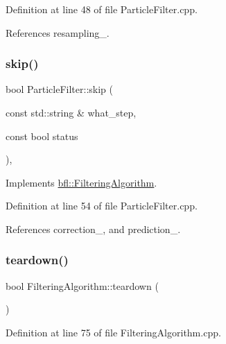 Definition at line 48 of file Particle\+Filter.\+cpp.



References resampling\+\_\+.

\mbox{\label{classbfl_1_1ParticleFilter_a2d7a5e7aaad179037273d35be229056d}} 
\subsubsection{\texorpdfstring{skip()}{skip()}}
{\footnotesize\ttfamily bool Particle\+Filter\+::skip (\begin{DoxyParamCaption}\item[{const std\+::string \&}]{what\+\_\+step,  }\item[{const bool}]{status }\end{DoxyParamCaption})\hspace{0.3cm}{\ttfamily [override]}, {\ttfamily [virtual]}}



Implements \mbox{\hyperlink{classbfl_1_1FilteringAlgorithm_ac8a718a614905d89d6a43bbbc70d68b2}{bfl\+::\+Filtering\+Algorithm}}.



Definition at line 54 of file Particle\+Filter.\+cpp.



References correction\+\_\+, and prediction\+\_\+.

\mbox{\label{classbfl_1_1FilteringAlgorithm_a1dc912d89ee8f96d4f3e8209865c5308}} 
\subsubsection{\texorpdfstring{teardown()}{teardown()}}
{\footnotesize\ttfamily bool Filtering\+Algorithm\+::teardown (\begin{DoxyParamCaption}{ }\end{DoxyParamCaption})\hspace{0.3cm}{\ttfamily [inherited]}}



Definition at line 75 of file Filtering\+Algorithm.\+cpp.



